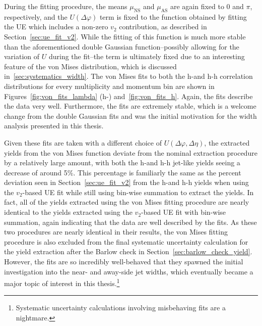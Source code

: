 During the fitting procedure, the means $\mu_{\text{NS}}$ and $\mu_{\text{AS}}$ are again fixed to 0 and $\pi$, respectively, and the $U(\Delta\varphi)$ term is fixed to the function obtained by fitting the UE which includes a non-zero $v_{2}$ contribution, as described in Section~\ref{sec:ue_fit_v2}. While the fitting of this function is much more stable than the aforementioned double Gaussian function--possibly allowing for the variation of $U$ during the fit--the term is ultimately fixed due to an interesting feature of the von Mises distribution, which is discussed in~\ref{sec:systematics_width}. The von Mises fits to both the h-\lmb and h-h correlation distributions for every multiplicity and momentum bin are shown in Figures~\ref{fig:von_fits_lambda} (h-\lmb) and~\ref{fig:von_fits_h}. Again, the fits describe the data very well. Furthermore, the fits are extremely stable, which is a welcome change from the double Gaussian fits and was the initial motivation for the width analysis presented in this thesis.

Given these fits are taken with a different choice of $U(\Delta\varphi, \Delta\eta)$, the extracted yields from the von Mises function deviate from the nominal extraction procedure by a relatively large amount, with both the h-\lmb and h-h jet-like yields seeing a decrease of around 5\%. This percentage is familiarly the same as the percent deviation seen in Section~\ref{sec:ue_fit_v2} from the h-\lmb and h-h yields when using the $v_{2}$-based UE fit while still using bin-wise summation to extract the yields.  In fact, all of the yields extracted using the von Mises fitting procedure are nearly identical to the yields extracted using the $v_{2}$-based UE fit with bin-wise summation, again indicating that the data are well described by the fits. As these two procedures are nearly identical in their results, the von Mises fitting procedure is also excluded from the final systematic uncertainty calculation for the yield extraction after the Barlow check in Section~\ref{sec:barlow_check_yield}. However, the fits are so incredibly well-behaved that they spawned the initial investigation into the near- and away-side jet widths, which eventually became a major topic of interest in this thesis.\footnote{Systematic uncertainty calculations involving misbehaving fits are a nightmare.}


